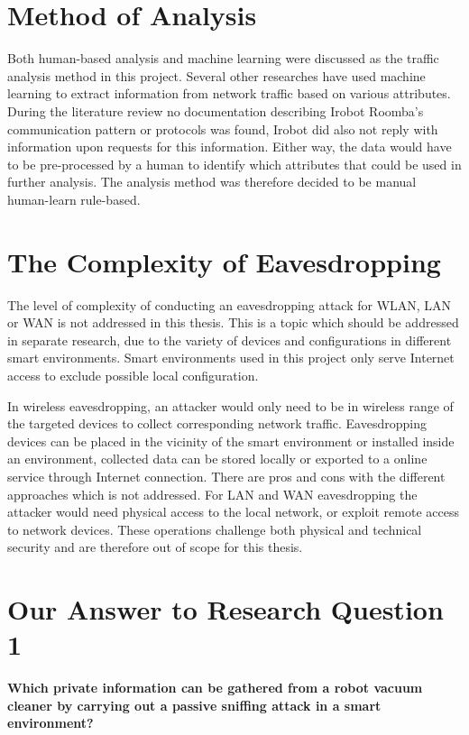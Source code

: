 \section{Method of Analysis}
Both human-based analysis and machine learning were discussed as the traffic analysis method in this project. Several other researches have used machine learning to extract information from network traffic based on various attributes. During the literature review no documentation describing Irobot Roomba's communication pattern or protocols was found, Irobot did also not reply with information upon requests for this information. Either way, the data would have to be pre-processed by a human to identify which attributes that could be used in further analysis. The analysis method was therefore decided to be manual human-learn rule-based. 

\section{The Complexity of Eavesdropping}
The level of complexity of conducting an eavesdropping attack for WLAN, LAN or WAN is not addressed in this thesis. This is a topic which should be addressed in separate research, due to the variety of devices and configurations in different smart environments. Smart environments used in this project only serve Internet access to exclude possible local configuration. 

In wireless eavesdropping, an attacker would only need to be in wireless range of the targeted devices to collect corresponding network traffic. Eavesdropping devices can be placed in the vicinity of the smart environment or installed inside an environment, collected data can be stored locally or exported to a online service through Internet connection. There are pros and cons with the different approaches which is not addressed. For LAN and WAN eavesdropping the attacker would need physical access to the local network, or exploit remote access to network devices. These operations challenge both physical and technical security and are therefore out of scope for this thesis. 

\section{Our Answer to Research Question 1}
\textbf{Which private information can be gathered from a robot vacuum cleaner by carrying out a passive sniffing attack in a smart environment?}

